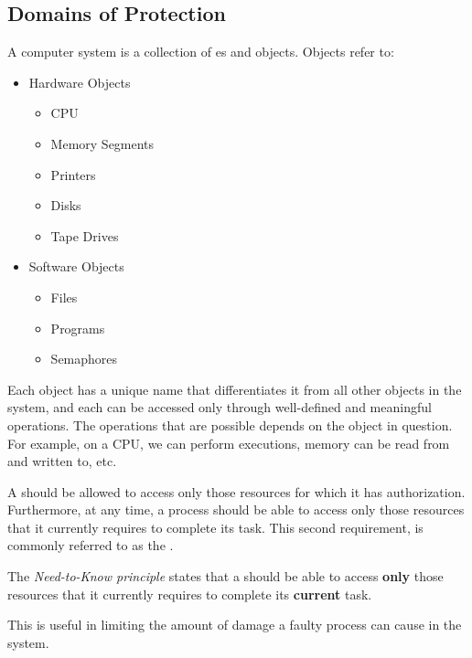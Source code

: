 \subsection{Domains of Protection}\label{subsec:Domains_of_Protection}
A computer system is a collection of es and objects.
Objects refer to:
\begin{itemize}[noitemsep]
\item Hardware Objects
  \begin{itemize}[noitemsep]
  \item CPU
  \item Memory Segments
  \item Printers
  \item Disks
  \item Tape Drives
  \end{itemize}
\item Software Objects
  \begin{itemize}[noitemsep]
  \item Files
  \item Programs
  \item Semaphores
  \end{itemize}
\end{itemize}

Each object has a unique name that differentiates it from all other objects in the system, and each can be accessed only through well-defined and meaningful operations.
The operations that are possible depends on the object in question.
For example, on a CPU, we can perform executions, memory can be read from and written to, etc.

A  should be allowed to access only those resources for which it has authorization.
Furthermore, at any time, a process should be able to access only those resources that it currently requires to complete its task.
This second requirement, is commonly referred to as the .

\begin{definition}\label{def:Need_To_Know_Principle}
  The \emph{Need-to-Know principle} states that a  should be able to access \textbf{only} those resources that it currently requires to complete its \textbf{current} task.

  This is useful in limiting the amount of damage a faulty process can cause in the system.
\end{definition}

